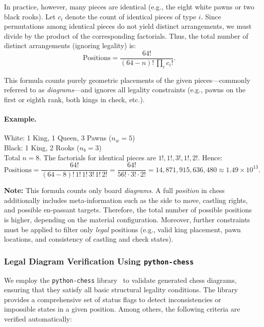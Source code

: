 \documentclass[12pt]{article}
\begin{document}
In practice, however, many pieces are identical (e.g., the eight white pawns or two black rooks).  
Let \(c_i\) denote the count of identical pieces of type \(i\).  
Since permutations among identical pieces do not yield distinct arrangements, we must divide by the product of the corresponding factorials.  
Thus, the total number of distinct arrangements (ignoring legality) is:
\[
\text{Positions} = \frac{64!}{(64 - n)! \, \prod_i c_i!}.
\]

This formula counts purely geometric placements of the given pieces—commonly referred to as \emph{diagrams}—and ignores all legality constraints (e.g., pawns on the first or eighth rank, both kings in check, etc.).

\paragraph{Example.}
White: 1 King, 1 Queen, 3 Pawns (\(n_w = 5\)) \\
Black: 1 King, 2 Rooks (\(n_b = 3\)) \\
Total \(n = 8\).  
The factorials for identical pieces are \(1!, 1!, 3!, 1!, 2!\).  
Hence:
\[
\text{Positions} = \frac{64!}{(64 - 8)! \, 1! \, 1! \, 3! \, 1! \, 2!}
= \frac{64!}{56! \cdot 3! \cdot 2!}
= 14{,}871{,}915{,}636{,}480 \approx 1.49 \times 10^{13}.
\]

\noindent
\textbf{Note:}  
This formula counts only board \emph{diagrams}.  
A full \emph{position} in chess additionally includes meta-information such as the side to move, castling rights, and possible en-passant targets.  
Therefore, the total number of possible positions is higher, depending on the material configuration.  
Moreover, further constraints must be applied to filter only \emph{legal} positions (e.g., valid king placement, pawn locations, and consistency of castling and check states).

\subsubsection{Legal Diagram Verification Using \texttt{python-chess}}

We employ the \texttt{python-chess} library~\cite{python-chess} to validate generated chess diagrams, ensuring that they satisfy all basic structural legality conditions. 
The library provides a comprehensive set of status flags to detect inconsistencies or impossible states in a given position. 
Among others, the following criteria are verified automatically:
\end{document}
